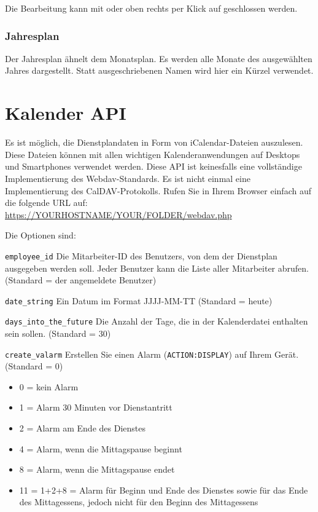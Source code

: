 Die Bearbeitung kann mit \keys{\esc} oder oben rechts per Klick auf  geschlossen werden.

\subsubsection{Jahresplan}
\begin{description}
    \item {}
\end{description}
Der Jahresplan ähnelt dem Monatsplan. Es werden alle Monate des ausgewählten Jahres dargestellt. Statt ausgeschriebenen Namen wird hier ein Kürzel verwendet.

\section{Kalender API}\label{section-calendar-api}
Es ist möglich, die Dienstplandaten in Form von iCalendar-Dateien auszulesen. Diese Dateien können mit allen wichtigen Kalenderanwendungen auf Desktops und Smartphones verwendet werden. Diese API ist keinesfalls eine
vollständige Implementierung des Webdav-Standards. Es ist nicht einmal eine
Implementierung des CalDAV-Protokolls. Rufen Sie in Ihrem Browser einfach
auf die folgende URL auf: \url{https://YOURHOSTNAME/YOUR/FOLDER/webdav.php}


Die Optionen sind:
\begin{description}
	\item \lstinline|employee_id| Die Mitarbeiter-ID des Benutzers, von dem der
Dienstplan ausgegeben werden soll. Jeder Benutzer kann die Liste aller
Mitarbeiter abrufen. (Standard = der angemeldete Benutzer)
	\item \lstinline|date_string| Ein Datum im Format JJJJ-MM-TT (Standard = heute)
	\item \lstinline|days_into_the_future| Die Anzahl der Tage, die in der
Kalenderdatei enthalten sein sollen. (Standard = 30)
	\item \lstinline|create_valarm| Erstellen Sie einen Alarm
(\lstinline|ACTION:DISPLAY|) auf Ihrem Gerät. (Standard = 0)
	\begin{itemize}
        \item 0 = kein Alarm
        \item 1 = Alarm 30 Minuten vor Dienstantritt
        \item 2 = Alarm am Ende des Dienstes
        \item 4 = Alarm, wenn die Mittagspause beginnt
        \item 8 = Alarm, wenn die Mittagspause endet
        \item 11 = 1+2+8 = Alarm für Beginn und Ende des Dienstes sowie für das Ende des
Mittagessens, jedoch nicht für den Beginn des Mittagessens
    \end{itemize}
\end{description}


